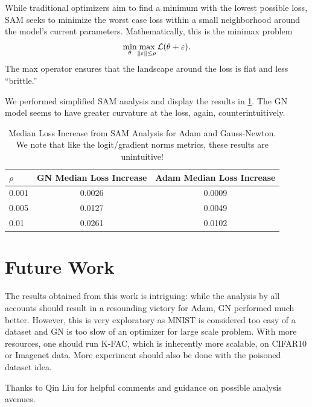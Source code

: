 \documentclass{article}
\begin{document}
    While traditional optimizers aim to find a minimum with the lowest possible loss, SAM seeks to minimize the worst case loss within a small neighborhood around the model's current parameters.
    Mathematically, this is the minimax problem
    \begin{align*}
        \min_{\theta} \max_{\norm{\varepsilon} \le \rho} \mathcal L(\theta + \varepsilon).
    \end{align*}
    The max operator ensures that the landscape around the loss is flat and less ``brittle.''

    We performed simplified SAM analysis and display the results in \cref{tab:sam_results}.
    The GN model seems to have greater curvature at the loss, again, counterintuitively.


    \begin{table}[ht!]
        \centering
        \caption{Median Loss Increase from SAM Analysis for Adam and Gauss-Newton.
        We note that like the logit/gradient norms metrics, these results are unintuitive!}
        \label{tab:sam_results}
        \begin{tabular}{|l|c|c|}
            \hline
            \textbf{$\rho$} & \textbf{GN Median Loss Increase} & \textbf{Adam Median Loss Increase} \\
            \hline
            0.001 & 0.0026 & 0.0009\\
            \hline
            0.005 & 0.0127 & 0.0049 \\
            \hline
            0.01 & 0.0261 & 0.0102  \\
            \hline
        \end{tabular}
    \end{table}

    \section{Future Work}
    The results obtained from this work is intriguing: while the analysis by all accounts should result in a resounding victory for Adam, GN performed much better.
    However, this is very exploratory as MNIST is considered too easy of a dataset and GN is too slow of an optimizer for large scale problem.
    With more resources, one should run K-FAC, which is inherently more scalable, on CIFAR10 or Imagenet data.
    More experiment should also be done with the poisoned dataset idea.

    \begin{ack}
        Thanks to Qin Liu for helpful comments and guidance on possible analysis avenues.
    \end{ack}
    
    
\end{document}

